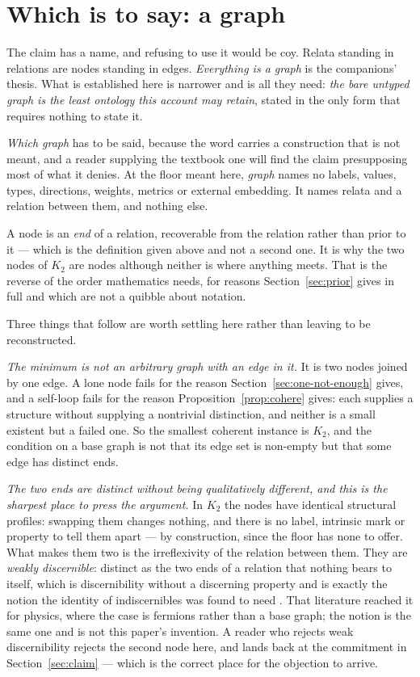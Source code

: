 \documentclass[11pt,a4paper]{article}
\begin{document}
\section{Which is to say: a graph}\label{sec:graph}
The claim has a name, and refusing to use it would be coy. Relata standing in relations are nodes
standing in edges. \emph{Everything is a graph} is the companions' thesis. What is established here is
narrower and is all they need: \emph{the bare untyped graph is the least ontology this account may
retain}, stated in the only form that requires nothing to state it.

\emph{Which graph} has to be said, because the word carries a construction that is not meant, and a
reader supplying the textbook one will find the claim presupposing most of what it denies. At the floor
meant here, \emph{graph} names no labels, values, types, directions, weights, metrics or external
embedding. It names relata and a relation between them, and nothing else.

A node is an \emph{end} of a relation, recoverable from the relation rather than prior to it --- which
is the definition given above and not a second one. It is why the two nodes of $K_2$ are nodes although
neither is where anything meets. That is the reverse of the order mathematics needs, for reasons
Section~\ref{sec:prior} gives in full and which are not a quibble about notation.

Three things that follow are worth settling here rather than leaving to be reconstructed.

\emph{The minimum is not an arbitrary graph with an edge in it.} It is two nodes joined by one edge.
A lone node fails for the reason Section~\ref{sec:one-not-enough} gives, and a self-loop fails for the
reason Proposition~\ref{prop:cohere} gives: each supplies a structure without supplying a nontrivial
distinction, and neither is a small existent but a failed one. So the smallest coherent instance is
$K_2$, and the condition on a base graph is not that its edge set is non-empty but that some edge has
distinct ends.

\emph{The two ends are distinct without being qualitatively different, and this is the sharpest place
to press the argument.} In $K_2$ the nodes have identical structural profiles: swapping them changes
nothing, and there is no label, intrinsic mark or property to tell them apart --- by construction,
since the floor has none to offer. What makes them two is the irreflexivity of the relation between
them. They are \emph{weakly discernible}: distinct as the two ends of a relation that nothing bears to
itself, which is discernibility without a discerning property and is exactly the notion the identity of
indiscernibles was found to need \citep{black1952,saunders2003}. That literature reached it for
physics, where the case is fermions rather than a base graph; the notion is the same one and is not
this paper's invention. A reader who rejects weak discernibility rejects the second node here, and
lands back at the commitment in Section~\ref{sec:claim} --- which is the correct place for the
objection to arrive.
\end{document}
